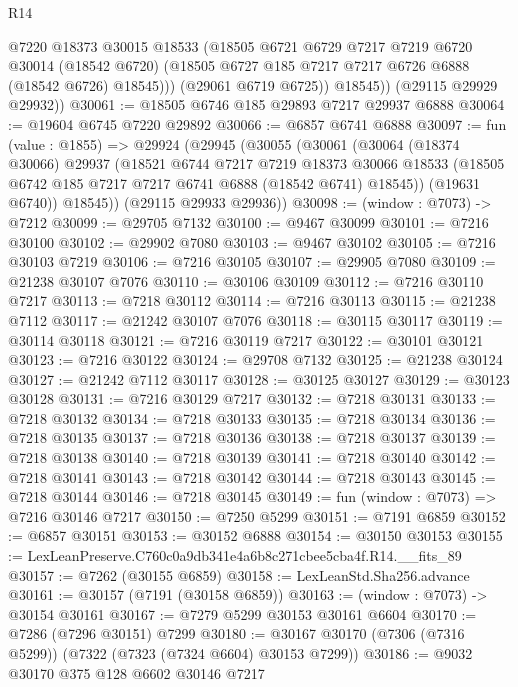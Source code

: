 \begin{lexlean}{R14}
\begin{coremodule}
              @7220
              @18373
              @30015
              @18533
              (@18505
                @6721
                @6729
                @7217
                @7219
                @6720
                @30014
                (@18542 @6720)
                (@18505 @6727 @185 @7217 @7217 @6726 @6888 (@18542 @6726) @18545)))
            (@29061 @6719 @6725))
          @18545))
      (@29115 @29929 @29932))
@30061 := @18505 @6746 @185 @29893 @7217 @29937 @6888
@30064 := @19604 @6745 @7220 @29892
@30066 := @6857 @6741 @6888
@30097 := fun (value : @1855) =>
  @29924
    (@29945
      (@30055
        (@30061
          (@30064
            (@18374 @30066)
            @29937
            (@18521
              @6744
              @7217
              @7219
              @18373
              @30066
              @18533
              (@18505 @6742 @185 @7217 @7217 @6741 @6888 (@18542 @6741) @18545))
            (@19631 @6740))
          @18545))
      (@29115 @29933 @29936))
@30098 := (window : @7073) -> @7212
@30099 := @29705 @7132
@30100 := @9467 @30099
@30101 := @7216 @30100
@30102 := @29902 @7080
@30103 := @9467 @30102
@30105 := @7216 @30103 @7219
@30106 := @7216 @30105
@30107 := @29905 @7080
@30109 := @21238 @30107 @7076
@30110 := @30106 @30109
@30112 := @7216 @30110 @7217
@30113 := @7218 @30112
@30114 := @7216 @30113
@30115 := @21238 @7112
@30117 := @21242 @30107 @7076
@30118 := @30115 @30117
@30119 := @30114 @30118
@30121 := @7216 @30119 @7217
@30122 := @30101 @30121
@30123 := @7216 @30122
@30124 := @29708 @7132
@30125 := @21238 @30124
@30127 := @21242 @7112 @30117
@30128 := @30125 @30127
@30129 := @30123 @30128
@30131 := @7216 @30129 @7217
@30132 := @7218 @30131
@30133 := @7218 @30132
@30134 := @7218 @30133
@30135 := @7218 @30134
@30136 := @7218 @30135
@30137 := @7218 @30136
@30138 := @7218 @30137
@30139 := @7218 @30138
@30140 := @7218 @30139
@30141 := @7218 @30140
@30142 := @7218 @30141
@30143 := @7218 @30142
@30144 := @7218 @30143
@30145 := @7218 @30144
@30146 := @7218 @30145
@30149 := fun (window : @7073) => @7216 @30146 @7217
@30150 := @7250 @5299
@30151 := @7191 @6859
@30152 := @6857 @30151
@30153 := @30152 @6888
@30154 := @30150 @30153
@30155 := LexLeanPreserve.C760c0a9db341e4a6b8c271cbee5cba4f.R14.__fits_89
@30157 := @7262 (@30155 @6859)
@30158 := LexLeanStd.Sha256.advance
@30161 := @30157 (@7191 (@30158 @6859))
@30163 := (window : @7073) -> @30154 @30161
@30167 := @7279 @5299 @30153 @30161 @6604
@30170 := @7286 (@7296 @30151) @7299
@30180 := @30167 @30170 (@7306 (@7316 @5299)) (@7322 (@7323 (@7324 @6604) @30153 @7299))
@30186 := @9032 @30170 @375 @128 @6602 @30146 @7217

\end{coremodule}
\end{lexlean}
